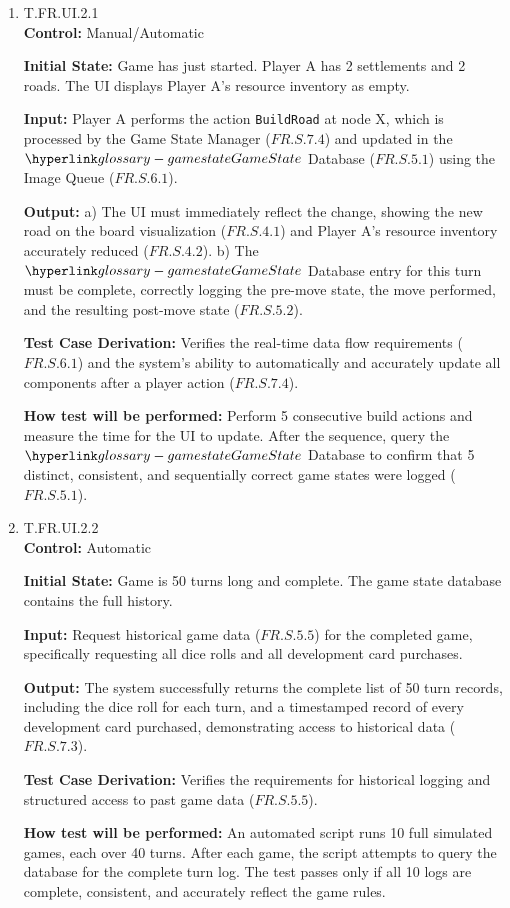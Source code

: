 \documentclass[12pt, titlepage]{article}
\begin{document}
\begin{enumerate}

\item{T.FR.UI.2.1\\}
\textbf{Control:} Manual/Automatic

\textbf{Initial State:} Game has just started. Player A has 2 settlements and 2 roads. The UI displays Player A's resource inventory as empty.

\textbf{Input:} Player A performs the action \texttt{BuildRoad} at node X, which is processed by the Game State Manager ($\hyperref[FR.S.7.4]{FR.S.7.4}$) and updated in the $\GameState{}$ Database ($\hyperref[FR.S.5.1]{FR.S.5.1}$) using the Image Queue ($\hyperref[FR.S.6.1]{FR.S.6.1}$).

\textbf{Output:}
    a) The UI must immediately reflect the change, showing the new road on the board visualization ($\hyperref[FR.S.4.1]{FR.S.4.1}$) and Player A's resource inventory accurately reduced ($\hyperref[FR.S.4.2]{FR.S.4.2}$).
    b) The $\GameState{}$ Database entry for this turn must be complete, correctly logging the pre-move state, the move performed, and the resulting post-move state ($\hyperref[FR.S.5.2]{FR.S.5.2}$).

\textbf{Test Case Derivation:} Verifies the real-time data flow requirements ($\hyperref[FR.S.6.1]{FR.S.6.1}$) and the system's ability to automatically and accurately update all components after a player action ($\hyperref[FR.S.7.4]{FR.S.7.4}$).

\textbf{How test will be performed:} Perform 5 consecutive build actions and measure the time for the UI to update. After the sequence, query the $\GameState{}$ Database to confirm that 5 distinct, consistent, and sequentially correct game states were logged ($\hyperref[FR.S.5.1]{FR.S.5.1}$).

\item{T.FR.UI.2.2\\}
\textbf{Control:} Automatic

\textbf{Initial State:} Game is 50 turns long and complete. The game state database contains the full history.

\textbf{Input:} Request historical game data ($\hyperref[FR.S.5.5]{FR.S.5.5}$) for the completed game, specifically requesting all dice rolls and all development card purchases.

\textbf{Output:} The system successfully returns the complete list of 50 turn records, including the dice roll for each turn, and a timestamped record of every development card purchased, demonstrating access to historical data ($\hyperref[FR.S.7.3]{FR.S.7.3}$).

\textbf{Test Case Derivation:} Verifies the requirements for historical logging and structured access to past game data ($\hyperref[FR.S.5.5]{FR.S.5.5}$).

\textbf{How test will be performed:} An automated script runs 10 full simulated games, each over 40 turns. After each game, the script attempts to query the database for the complete turn log. The test passes only if all 10 logs are complete, consistent, and accurately reflect the game rules.

\end{enumerate}
\end{document}
